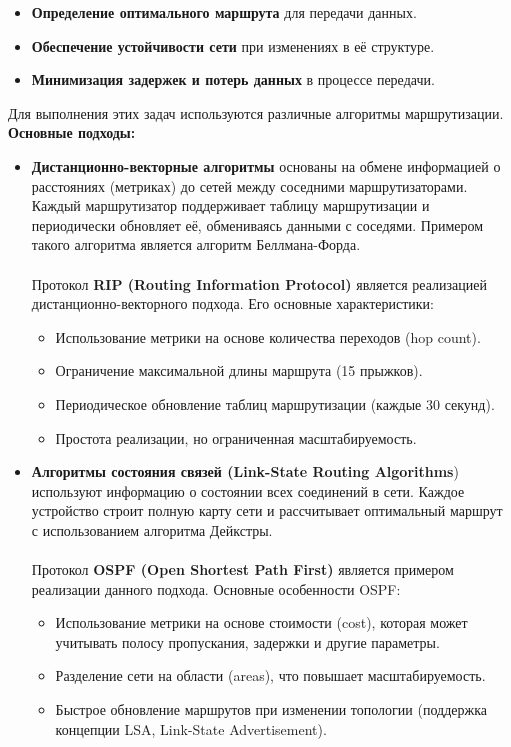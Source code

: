 \documentclass[a4paper, 12pt]{report}
\numberwithin{equation}{section}
\begin{document}
\begin{itemize}
	\item \textbf{Определение оптимального маршрута} для передачи данных.
	\item \textbf{Обеспечение устойчивости сети} при изменениях в её структуре.
	\item \textbf{Минимизация задержек и потерь данных} в процессе передачи.
\end{itemize}
Для выполнения этих задач используются различные алгоритмы маршрутизации. \textbf{Основные подходы:}
\begin{itemize}
	\item \textbf{Дистанционно-векторные алгоритмы} основаны на обмене информацией о расстояниях (метриках) до сетей между соседними маршрутизаторами. Каждый маршрутизатор поддерживает таблицу маршрутизации и периодически обновляет её, обмениваясь данными с соседями. Примером такого алгоритма является алгоритм Беллмана-Форда.
	\\\\ 
	Протокол \textbf{RIP ({Routing Information Protocol})} является реализацией дистанционно-векторного подхода. Его основные характеристики:
	\begin{itemize}
		\item Использование метрики на основе количества переходов (hop count).
		\item Ограничение максимальной длины маршрута (15 прыжков).
		\item Периодическое обновление таблиц маршрутизации (каждые 30 секунд).
		\item Простота реализации, но ограниченная масштабируемость.
	\end{itemize}
	\item \textbf{Алгоритмы состояния связей (Link-State Routing Algorithms}) используют информацию о состоянии всех соединений в сети. Каждое устройство строит полную карту сети и рассчитывает оптимальный маршрут с использованием алгоритма Дейкстры. 
	\\\\
	Протокол \textbf{OSPF ({Open Shortest Path First})} является примером реализации данного подхода. Основные особенности OSPF:
	\begin{itemize}
		\item Использование метрики на основе стоимости ({cost}), которая может учитывать полосу пропускания, задержки и другие параметры.
		\item Разделение сети на области ({areas}), что повышает масштабируемость.
		\item Быстрое обновление маршрутов при изменении топологии (поддержка концепции LSA, {Link-State Advertisement}).

\end{itemize}
\end{itemize}
\end{document}

